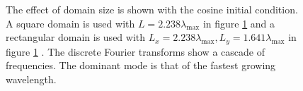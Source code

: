 \documentclass[a4paper,12pt]{article}
\begin{document}
  \begin{figure} 
   \centering
   \caption{The effect of domain size is shown with the cosine initial condition. A square domain is used with $L=2.238\lambda_\text{max}$ in figure \ref{fig_domain_size_effect}  and a rectangular domain is used with $L_x = 2.238 \lambda_\text{max}, L_y=1.641 \lambda_\text{max}$ in figure \ref{fig_domain_size_effect} . The discrete Fourier transforms show a cascade of frequencies. The dominant mode is that of the fastest growing wavelength.}
   \label{fig_domain_size_effect}
  \end{figure}



\end{document}
